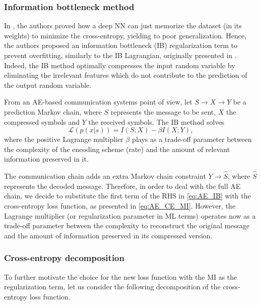 \subsubsection{Information bottleneck method}
\label{subsec:autoencoders_IB}
In \cite{Soatto2018}, the authors proved how a deep NN can just memorize the dataset (in its weights) to minimize the cross-entropy, yielding to poor generalization. Hence, the authors proposed an information bottleneck (IB) regularization term to prevent overfitting, similarly to the IB Lagrangian, originally presented in \cite{Tishby1999}. Indeed, the IB method optimally compresses the input random variable by eliminating the irrelevant features which do not contribute to the prediction of the output random variable. 

From an AE-based communication systems point of view, let $S \rightarrow X \rightarrow Y$ be a prediction Markov chain, where $S$ represents the message to be sent, $X$ the compressed symbols and $Y$ the received symbols. The IB method solves
\begin{equation}
\label{eq:AE_IB}
\mathcal{L}(p(x|s)) = I(S;X)-\beta I(X;Y),
\end{equation}
where the positive Lagrange multiplier $\beta$ plays as a trade-off parameter between the complexity of the encoding scheme (rate) and the amount of relevant information preserved in it. 

The communication chain adds an extra Markov chain constraint $Y\rightarrow \hat{S}$, where $\hat{S}$ represents the decoded message. Therefore, in order to deal with the full AE chain, we decide to substitute the first term of the RHS in \eqref{eq:AE_IB} with the cross-entropy loss function, as presented in \eqref{eq:AE_CE_MI}. However, the Lagrange multiplier (or regularization parameter in ML terms) operates now as a trade-off parameter between the complexity to reconstruct the original message and the amount of information preserved in its compressed version.

\subsubsection{Cross-entropy decomposition}
\label{subsec:autoencoders_decomposition}
To further motivate the choice for the new loss function with the MI as the regularization term, let us consider the following decomposition of the cross-entropy loss function.

